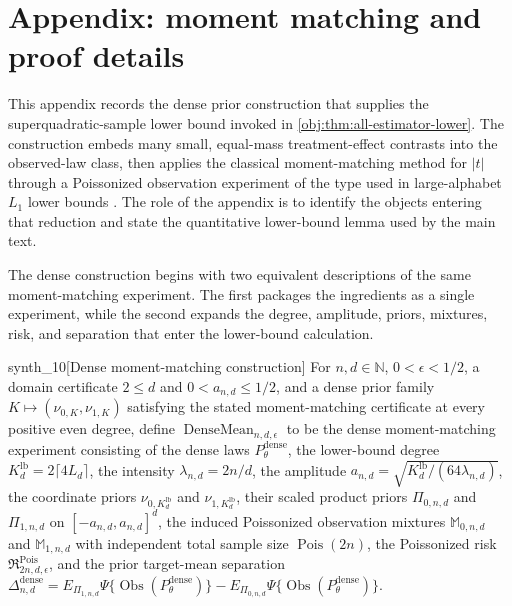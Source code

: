 \section{Appendix: moment matching and proof details}

This appendix records the dense prior construction that supplies the superquadratic-sample lower bound invoked in \cref{obj:thm:all-estimator-lower}. The construction embeds many small, equal-mass treatment-effect contrasts into the observed-law class, then applies the classical moment-matching method for \(|t|\) \citep{CaiLow2011L1} through a Poissonized observation experiment of the type used in large-alphabet \(L_1\) lower bounds \citep{JiaoHanWeissman2018L1}. The role of the appendix is to identify the objects entering that reduction and state the quantitative lower-bound lemma used by the main text.

The dense construction begins with two equivalent descriptions of the same moment-matching experiment. The first packages the ingredients as a single experiment, while the second expands the degree, amplitude, priors, mixtures, risk, and separation that enter the lower-bound calculation.

\begin{definitionv}{synth_10}[Dense moment-matching construction]
For \(n,d\in\mathbb N\), \(0<\epsilon<1/2\), a domain certificate \(2\le d\) and \(0<a_{n,d}\le 1/2\), and a dense prior family \(K\mapsto(\nu_{0,K},\nu_{1,K})\) satisfying the stated moment-matching certificate at every positive even degree, define \(\operatorname{DenseMean}_{n,d,\epsilon}\) to be the dense moment-matching experiment consisting of the dense laws \(P_\theta^{\mathrm{dense}}\), the lower-bound degree \(K_d^{\mathrm{lb}}=2\lceil4L_d\rceil\), the intensity \(\lambda_{n,d}=2n/d\), the amplitude \(a_{n,d}=\sqrt{K_d^{\mathrm{lb}}/(64\lambda_{n,d})}\), the coordinate priors \(\nu_{0,K_d^{\mathrm{lb}}}\) and \(\nu_{1,K_d^{\mathrm{lb}}}\), their scaled product priors \(\Pi_{0,n,d}\) and \(\Pi_{1,n,d}\) on \([-a_{n,d},a_{n,d}]^d\), the induced Poissonized observation mixtures \(\mathbb M_{0,n,d}\) and \(\mathbb M_{1,n,d}\) with independent total sample size \(\operatorname{Pois}(2n)\), the Poissonized risk \(\mathfrak R^{\mathrm{Pois}}_{2n,d,\epsilon}\), and the prior target-mean separation \(\Delta_{n,d}^{\mathrm{dense}}=E_{\Pi_{1,n,d}}\Psi\{\operatorname{Obs}(P_\theta^{\mathrm{dense}})\}-E_{\Pi_{0,n,d}}\Psi\{\operatorname{Obs}(P_\theta^{\mathrm{dense}})\}\).
\end{definitionv}

